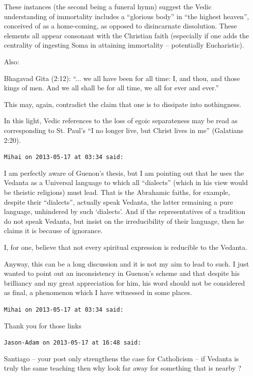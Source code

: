 \begin{footnotesize}
\begin{sffamily}
These instances (the second being a funeral hymn) suggest the Vedic understanding of immortality includes a ``glorious body'' in ``the highest heaven'', conceived of as a home-coming, as opposed to disincarnate dissolution. These elements all appear consonant with the Christian faith (especially if one adds the centrality of ingesting Soma in attaining immortality -- potentially Eucharistic).

Also:

Bhagavad Gita (2:12): ``... we all have been for all time: I, and thou, and those kings of men. And we all shall be for all time, we all for ever and ever.''

This may, again, contradict the claim that one is to dissipate into nothingness.

In this light, Vedic references to the loss of egoic separateness may be read as corresponding to St. Paul's ``I no longer live, but Christ lives in me'' (Galatians 2:20).

\hfill

\texttt{Mihai on 2013-05-17 at 03:34 said:}

I am perfectly aware of Guenon's thesis, but I am pointing out that he uses the Vedanta as a Universal language to which all ``dialects'' (which in his view would be theistic religions) must lead. That is the Abrahamic faiths, for example, despite their ``dialects'', actually speak Vedanta, the latter remaining a pure language, unhindered by such `dialects'. And if the representatives of a tradition do not speak Vedanta, but insist on the irreducibility of their language, then he claims it is because of ignorance.

I, for one, believe that not every spiritual expression is reducible to the Vedanta.

Anyway, this can be a long discussion and it is not my aim to lead to such. I just wanted to point out an inconsistency in Guenon's scheme and that despite his brilliancy and my great appreciation for him, his word should not be considered as final, a phenomenon which I have witnessed in some places.

\hfill

\texttt{Mihai on 2013-05-17 at 03:34 said:}

Thank you for those links

\hfill

\texttt{Jason-Adam on 2013-05-17 at 16:48 said:}

Santiago -- your post only strengthens the case for Catholicism -- if Vedanta is truly the same teaching then why look far away for something that is nearby ?


\end{sffamily}
\end{footnotesize}
